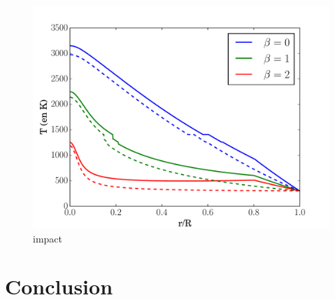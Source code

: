 \documentclass[10pt,a4paper]{article}
\numberwithin{equation}{section}
\begin{document}
\begin{figure}[h]
    \centering	    
	\includegraphics[scale=0.5]{figures/profil_acre_impact.pdf}
    \caption{impact}
    	\label{impact} 
\end{figure}


\newpage
\section{Conclusion}

\newpage

 
\end{document}
